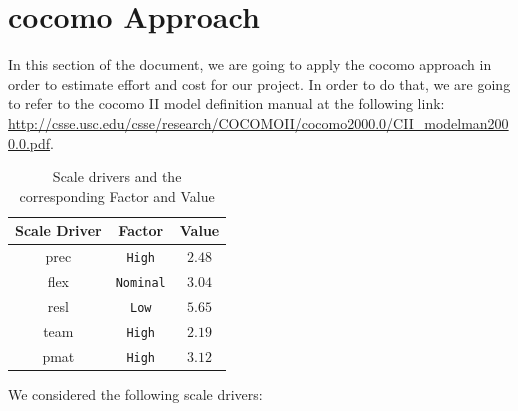 \section{\acs{cocomo} Approach} \label{sec:cocomo}

In this section of the document, we are going to apply the \acs{cocomo} approach in order to estimate effort and cost for our project.
In order to do that, we are going to refer to the \acs{cocomo} II model definition manual at the following link: \url {http://csse.usc.edu/csse/research/COCOMOII/cocomo2000.0/CII_modelman2000.0.pdf}.

\begin{table}[htbp]
\begin{center}
\begin{tabular}[t]{ccc}

\hline
\textbf{Scale Driver} & \textbf{Factor} & \textbf{Value} \\
\hline
\acs{prec} & \texttt{High} &  $2.48$\\
\hline
\acs{flex} & \texttt{Nominal} & $3.04$\\
\hline
\acs{resl}&  \texttt{Low} &  $5.65$\\
\hline
\acs{team} & \texttt{High} &  $2.19$\\
\hline
\acs{pmat} & \texttt{High} & $3.12$ \\
\hline

\end{tabular}
\caption{Scale drivers and the corresponding Factor and Value}
\end{center}
\end{table}

We considered the following scale drivers:

